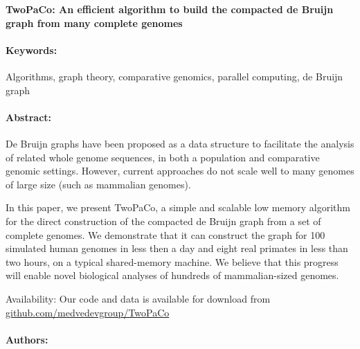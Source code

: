 \documentclass[11pt]{article}
\date{}
\author{}
\begin{document}
\noindent
\large {\bf TwoPaCo: An efficient algorithm to build the compacted de Bruijn graph from many complete genomes} 


\normalsize 


\noindent \paragraph{Keywords:} 
Algorithms, graph theory, comparative genomics, parallel computing, de Bruijn graph

\noindent \paragraph{Abstract:} 

De Bruijn graphs have been proposed as a data structure to facilitate the analysis of related
whole genome sequences, in both a population and comparative genomic settings. However, current
approaches do not scale well to many genomes of large size (such as mammalian genomes).

In this paper, we present TwoPaCo, a simple and scalable low memory algorithm for the direct
construction of the compacted de Bruijn graph from a set of complete genomes. We demonstrate that it
can construct the graph for 100 simulated human genomes in less then a day and eight real primates in
less than two hours, on a typical shared-memory machine. We believe that this progress will enable novel
biological analyses of hundreds of mammalian-sized genomes.

Availability: Our code and data is available for download from \url{github.com/medvedevgroup/TwoPaCo}

\noindent \paragraph{Authors:} 
\end{document}
